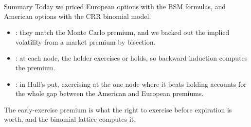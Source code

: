 \documentclass[aspectratio=169,11pt]{beamer}
\begin{document}
\begin{frame}{Summary}
  Today we priced European options with the BSM formulas, and American options
  with the CRR binomial model.

  \vspace{0.3em}
  {\large\textbf{}}
  \begin{itemize}\setlength{\itemsep}{0.15em}
    \item {}:
      they match the Monte Carlo premium, and we backed out the implied
      volatility from a market premium by bisection.
    \item {}: at each node, the
      holder exercises or holds, so backward induction computes the premium.
    \item {}: in
      Hull's put, exercising at the one node where it beats holding accounts
      for the whole gap between the American and European premiums.
  \end{itemize}

  \vspace{0.1em}
  The early-exercise premium is what the right to exercise before expiration is
  worth, and the binomial lattice computes it.
\end{frame}
\end{document}
